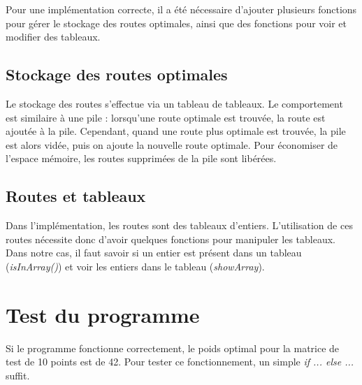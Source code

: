 Pour une implémentation correcte, il a été nécessaire d'ajouter plusieurs fonctions pour gérer le stockage des routes optimales, ainsi que des fonctions pour voir et modifier des tableaux.

\subsection{Stockage des routes optimales}

Le stockage des routes s'effectue via un tableau de tableaux. Le comportement est similaire à une pile : lorsqu'une route optimale est trouvée, la route est ajoutée à la pile. Cependant, quand une route plus optimale est trouvée, la pile est alors vidée, puis on ajoute la nouvelle route optimale.
Pour économiser de l'espace mémoire, les routes supprimées de la pile sont libérées.

\subsection{Routes et tableaux}

Dans l'implémentation, les routes sont des tableaux d'entiers. L'utilisation de ces routes nécessite donc d'avoir quelques fonctions pour manipuler les tableaux. Dans notre cas, il faut savoir si un entier est présent dans un tableau (\textit{isInArray()}) et voir les entiers dans le tableau (\textit{showArray}).

\section{Test du programme}

Si le programme fonctionne correctement, le poids optimal pour la matrice de test de 10 points est de 42. Pour tester ce fonctionnement, un simple \textit{if ... else ...} suffit.

\lstset{style=customc}





